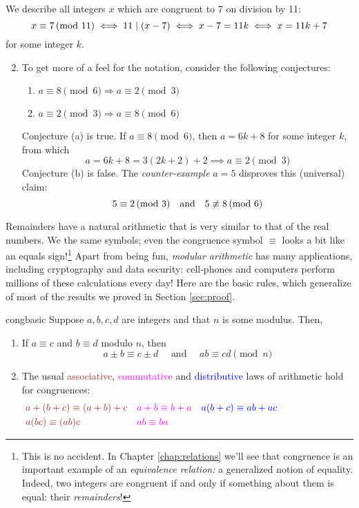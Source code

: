 \goodbreak


\begin{examples}{}{}
\exstart We describe all integers $x$ which are congruent to 7 on division by 11:
	\[
		x\equiv 7\negthickspace\pmod{11}\iff 11\mid(x-7) \iff x-7=11k\iff x=11k+7
	\]
	for some integer $k$.
	\goodbreak

\begin{enumerate}\setcounter{enumi}{1}
  \item To get more of a feel for the notation, consider the following conjectures:
	\begin{enumerate}
	    \item $a\equiv 8\pmod 6\Longrightarrow a\equiv 2\pmod 3$
	    \item $a\equiv 2\pmod 3\Longrightarrow a\equiv 8\pmod 6$
	\end{enumerate}
	Conjecture (a) is true. If $a\equiv 8\pmod 6$, then $a=6k+8$ for some integer $k$, from which
		\[
			a=6k+8 =3(2k+2)+2 \implies a\equiv 2\pmod 3
		\]
		Conjecture (b) is false. The \emph{counter-example} $a=5$ disproves this (universal) claim:
		\[
			5\equiv 2\negthickspace\pmod{3} \quad\text{and}\quad 5\not\equiv 8\negthickspace\pmod{6}
		\]
	\end{enumerate}
\end{examples}




Remainders have a natural arithmetic that is very similar to that of the real numbers. We the same symbols; even the congruence symbol $\equiv$ looks a bit like an equals sign!\footnote{This is no accident. In Chapter \ref{chap:relations} we'll see that congruence is an important example of an \emph{equivalence relation:} a generalized notion of equality. Indeed, two integers are congruent if and only if something about them is equal: their \emph{remainders}!} Apart from being fun, \emph{modular arithmetic} has many applications, including cryptography and data security: cell-phones and computers perform millions of these calculations every day! Here are the basic rules, which generalize of most of the results we proved in Section \ref{sec:proof}.

\begin{thm}{}{congbasic}
	Suppose $a,b,c,d$ are integers and that $n$ is some modulus. Then,
	\begin{enumerate}
	  \item If $a\equiv c$ and $b\equiv d$ modulo $n$, then
	  \[
	  	a\pm b\equiv c\pm d\quad\text{ and }\quad ab\equiv cd \pmod n
	  \]
	  \item The usual \textcolor{Brown}{associative}, \textcolor{Magenta}{commutative} and \textcolor{blue}{distributive} laws of arithmetic hold for congruences:
		\begin{align*}
			&\textcolor{Brown}{a+(b+c)\equiv (a+b)+c}
			&&\textcolor{Magenta}{a+b\equiv b+a}
			&&\textcolor{blue}{a(b+c)\equiv ab+ac} \hspace{75pt}\\
			&\textcolor{Brown}{a(bc)\equiv (ab)c}
			&&\textcolor{Magenta}{ab\equiv ba}
		\end{align*}
	\end{enumerate}
\end{thm}


